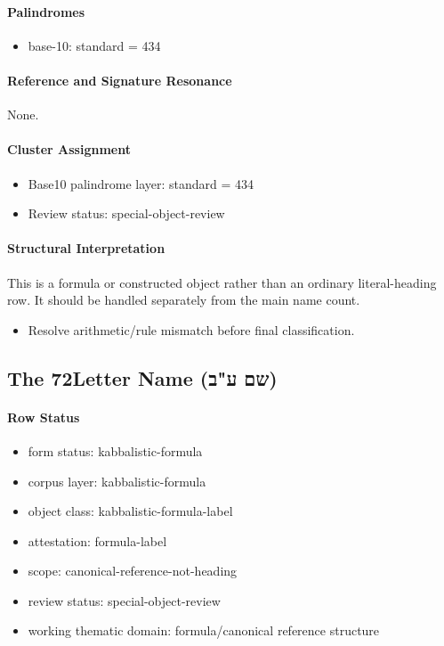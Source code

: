 \paragraph{Palindromes}
\begin{itemize}
\item base-10: standard = 434
\end{itemize}
\paragraph{Reference and Signature Resonance}
None.
\paragraph{Cluster Assignment}
\begin{itemize}
\item Base10 palindrome layer: standard = 434
\item Review status: special-object-review
\end{itemize}
\paragraph{Structural Interpretation}
This is a formula or constructed object rather than an ordinary literal-heading row. It should be handled separately from the main name count.

\begin{itemize}
\item Resolve arithmetic/rule mismatch before final classification.
\end{itemize}

\subsection{The 72Letter Name (שם ע"ב)}
\paragraph{Row Status}
\begin{itemize}
\item form status: kabbalistic-formula
\item corpus layer: kabbalistic-formula
\item object class: kabbalistic-formula-label
\item attestation: formula-label
\item scope: canonical-reference-not-heading
\item review status: special-object-review
\item working thematic domain: formula/canonical reference structure
\end{itemize}
